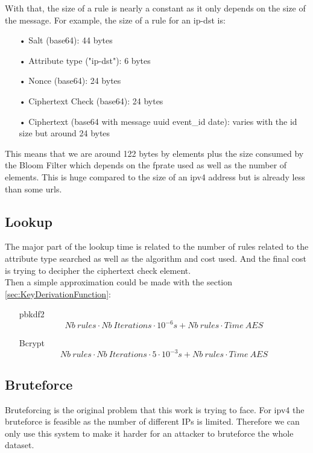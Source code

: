 \documentclass{eplmastersthesis}
\begin{document}
With that, the size of a rule is nearly a constant as it only depends on the size of the message. For example, the size of a rule for an ip-dst is:
\begin{itemize}
\item[•] Salt (base64): 44 bytes
\item[•] Attribute type ("ip-dst"): 6 bytes
\item[•] Nonce (base64): 24 bytes
\item[•] Ciphertext Check (base64): 24 bytes
\item[•] Ciphertext (base64 with message uuid event\_id date): varies with the id size but around 24 bytes
\end{itemize}
This means that we are around 122 bytes by elements plus the size consumed by the Bloom Filter which depends on the \gls{fp}rate used as well as the number of elements. This is huge compared to the size of an \gls{ipv4} address but is already less than some \glspl{url}.

\subsection{Lookup}
The major part of the lookup time is related to the number of rules related to the attribute type searched as well as the algorithm and cost used. And the final cost is trying to decipher the ciphertext check element.\\

Then a simple approximation could be made with the section \ref{sec:KeyDerivationFunction}:
\begin{itemize}
\item[\gls{pbkdf2}] $$Nb\ rules \cdot Nb\ Iterations \cdot 10^{-6}s + Nb\ rules \cdot Time\ AES$$
\item[Bcrypt]  $$Nb\ rules \cdot Nb\ Iterations \cdot 5 \cdot 10^{-3}s + Nb\ rules \cdot Time\ AES$$
\end{itemize}

\subsection{Bruteforce}
Bruteforcing is the original problem that this work is trying to face. For \gls{ipv4} the bruteforce is feasible as the number of different IPs is limited. Therefore we can only use this system to make it harder for an attacker to bruteforce the whole dataset.\\
\end{document}
